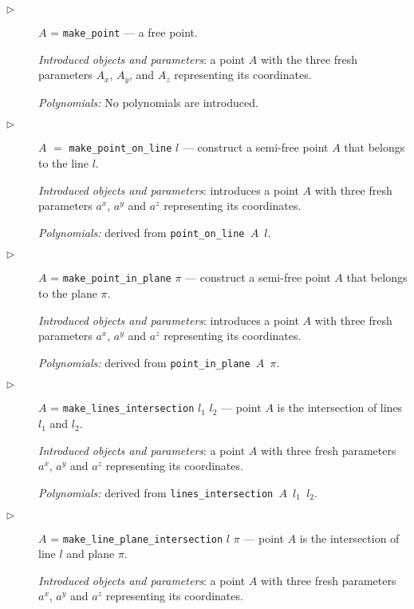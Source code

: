 \documentclass{article}
\begin{document}
\begin{description}

\item[$\triangleright$] $A$ = {\tt make\_point} --- a free point.

  {\em Introduced objects and parameters}: a point $A$ with the three
  fresh parameters $A_x$, $A_y$, and $A_z$ representing its
  coordinates.

  {\em Polynomials:} No polynomials are introduced.

\item[$\triangleright$] $A$ $=$ {\tt make\_point\_on\_line} $l$ ---
  construct a semi-free point $A$ that belongs to the line $l$.
  
  {\em Introduced objects and parameters}: introduces a point $A$ with
  three fresh parameters $a^x$, $a^y$ and $a^z$ representing its
  coordinates.

  {\em Polynomials:} derived from {\tt point\_on\_line $A$ $l$}.

\item[$\triangleright$] $A$ = {\tt make\_point\_in\_plane} $\pi$ ---
  construct a semi-free point $A$ that belongs to the plane $\pi$.

  {\em Introduced objects and parameters}: introduces a point $A$ with
  three fresh parameters $a^x$, $a^y$ and $a^z$ representing its
  coordinates.
  
  {\em Polynomials:} derived from {\tt point\_in\_plane $A$ $\pi$}.

\item[$\triangleright$] $A$ = {\tt make\_lines\_intersection} $l_1$
  $l_2$ --- point $A$ is the intersection of lines $l_1$ and $l_2$.

  {\em Introduced objects and parameters}: a point $A$ with three
  fresh parameters $a^x$, $a^y$ and $a^z$ representing its
  coordinates.

  {\em Polynomials:} derived from {\tt lines\_intersection $A$ $l_1$ $l_2$}.

\item[$\triangleright$] $A$ = {\tt make\_line\_plane\_intersection}
  $l$ $\pi$ --- point $A$ is the intersection of line $l$ and plane
  $\pi$.

  {\em Introduced objects and parameters}: a point $A$ with three
  fresh parameters $a^x$, $a^y$ and $a^z$ representing its
  coordinates.


\end{description}
\end{document}
